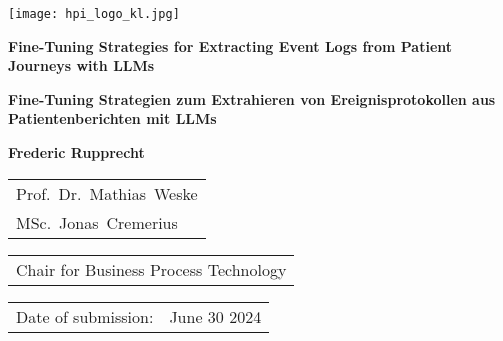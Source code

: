 \begin{titlepage}
	\begin{flushright}
		\texttt{[image: hpi\_logo\_kl.jpg]}
	\end{flushright}
	\begin{center}
		\hbox{}
		\vfill
		{\huge\bfseries Fine-Tuning Strategies for Extracting Event Logs from Patient Journeys with LLMs \par}
		\vskip 0.5cm
		{\huge\bfseries Fine-Tuning Strategien zum Extrahieren von Ereignisprotokollen aus Patientenberichten mit LLMs \par}
		\vskip 1.5cm
		\textbf{Frederic Rupprecht}\\
		\vskip 1.5cm
		\begin{tabular}{l}
			Prof.~Dr.~Mathias~Weske \\
			MSc.~Jonas~Cremerius \\
		\end{tabular}
		\vskip 0.25cm
		\begin{tabular}{l}
			Chair for  Business Process Technology
		\end{tabular}
		\vskip 1.5cm
		\begin{tabular}{ll}
			Date of submission: & June 30 2024 \\
		\end{tabular}
	\end{center}	
	\vfill
\end{titlepage}

